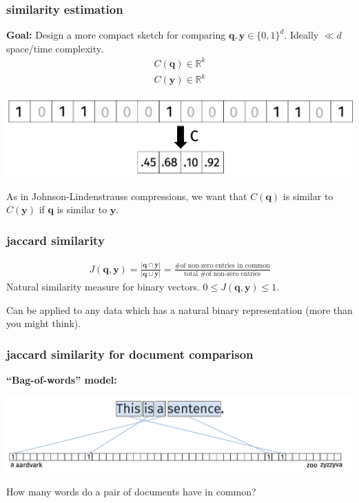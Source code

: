 \documentclass[compress]{beamer}
\newcommand{\bv}[1]{\mathbf{#1}}
\newcommand{\R}{\mathbb{R}}
\begin{document}
\begin{frame}
	\frametitle{similarity estimation}
	\textbf{Goal:} Design a more compact sketch for comparing $\bv{q}, \bv{y}\in \{0,1\}^d$. Ideally $\ll d$ space/time complexity.
		\begin{align*}
				C(\textbf{q}) \in \R^k \\	
				C(\textbf{y}) \in \R^k 
			\end{align*}
		\begin{center}
				\vspace{-.5em}
				\includegraphics[width=.8\textwidth]{compression.png}
				\vspace{-.5em}
			\end{center}
			As in Johnson-Lindenstrauss compressions, we want that	$C(\bv{q})$ is similar to $C(\bv{y})$ if $\bv{q}$ is similar to $\bv{y}$.
\end{frame}

\begin{frame}
	\frametitle{jaccard similarity}
	\begin{definition}
			\begin{align*}
					J(\bv{q},\bv{y}) = \frac{|\bv{q} \cap \bv{y}|}{|\bv{q} \cup \bv{y}|} = \frac{\text{\# of non-zero entries in common}}{\text{total \# of non-zero entries}}
				\end{align*}
			Natural similarity measure for binary vectors. $0\leq J(\bv{q},\bv{y})\leq 1$.
		\end{definition}
	
	Can be applied to any data which has a natural binary representation (more than you might think). 
\end{frame}

\begin{frame}
	\frametitle{jaccard similarity for document comparison}
	\textbf{``Bag-of-words'' model:}
	\begin{center}
			\includegraphics[width=.95\textwidth]{bagofwords.png}
		\end{center}
	
	How many words do a pair of documents have in common?
\end{frame}
\end{document}
